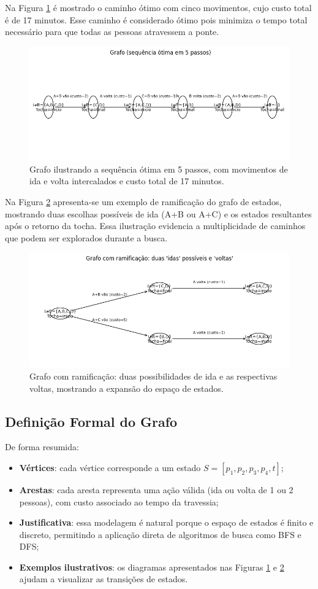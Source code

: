 \documentclass[12pt,a4paper]{article}
\begin{document}
Na Figura \ref{fig:cen1} é mostrado o caminho ótimo com cinco movimentos, cujo custo total é de 17 minutos. Esse caminho é considerado ótimo pois minimiza o tempo total necessário para que todas as pessoas atravessem a ponte.
\begin{figure}[H]
    \centering
    \includegraphics[width=0.8\linewidth]{optimal_path}
    \caption{Grafo ilustrando a sequência ótima em 5 passos, com movimentos de ida e volta intercalados e custo total de 17 minutos.}
    \label{fig:cen1}
\end{figure}

Na Figura \ref{fig:cen2} apresenta-se um exemplo de ramificação do grafo de estados, mostrando duas escolhas possíveis de ida (A+B ou A+C) e os estados resultantes após o retorno da tocha. Essa ilustração evidencia a multiplicidade de caminhos que podem ser explorados durante a busca.

\begin{figure}[H]
    \centering
    \includegraphics[width=0.8\linewidth]{ramification.png}
    \caption{Grafo com ramificação: duas possibilidades de ida e as respectivas voltas, mostrando a expansão do espaço de estados.}
    \label{fig:cen2}
\end{figure}

\subsection{Definição Formal do Grafo}
De forma resumida:
\begin{itemize}
\item \textbf{Vértices}: cada vértice corresponde a um estado $S = [p_1, p_2, p_3, p_4, t]$;
\item \textbf{Arestas}: cada aresta representa uma ação válida (ida ou volta de 1 ou 2 pessoas), com custo associado ao tempo da travessia;
\item \textbf{Justificativa}: essa modelagem é natural porque o espaço de estados é finito e discreto, permitindo a aplicação direta de algoritmos de busca como BFS e DFS;
\item \textbf{Exemplos ilustrativos}: os diagramas apresentados nas Figuras \ref{fig:cen1} e \ref{fig:cen2} ajudam a visualizar as transições de estados.
\end{itemize}
\end{document}
